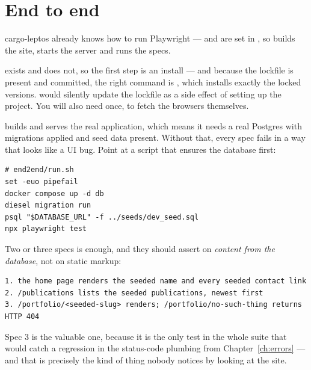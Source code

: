 \section{End to end}

cargo-leptos already knows how to run Playwright ---  and  are
set in , so  builds the site, starts the server and
runs the specs.

\begin{pitfall}
 exists and  does not, so the first step
is an install --- and because the lockfile is present and committed, the right command is
, which installs exactly the locked versions.  would silently update
the lockfile as a side effect of setting up the project. You will also need
 once, to fetch the browsers themselves.
\end{pitfall}

\begin{pitfall}
 builds and serves the real application, which means it needs a real
Postgres with migrations applied and seed data present. Without that, every spec fails in a way
that looks like a UI bug. Point  at a script that ensures the database first:
\begin{lstlisting}[style=sh]
# end2end/run.sh
set -euo pipefail
docker compose up -d db
diesel migration run
psql "$DATABASE_URL" -f ../seeds/dev_seed.sql
npx playwright test
\end{lstlisting}
\end{pitfall}

Two or three specs is enough, and they should assert on \emph{content from the database}, not on
static markup:

\begin{lstlisting}[style=out]
1. the home page renders the seeded name and every seeded contact link
2. /publications lists the seeded publications, newest first
3. /portfolio/<seeded-slug> renders; /portfolio/no-such-thing returns HTTP 404
\end{lstlisting}

Spec 3 is the valuable one, because it is the only test in the whole suite that would catch a
regression in the status-code plumbing from Chapter~\ref{ch:errors} --- and that is precisely the
kind of thing nobody notices by looking at the site.


